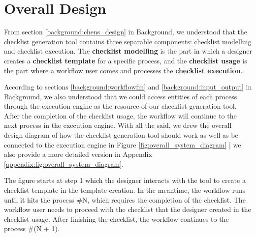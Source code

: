 


\section{Overall Design}
\label{design:overall}

From section \ref{background:chens_design} in Background, we understood that the checklist generation tool contains three separable components: checklist modelling and checklist execution. The \textbf{checklist modelling} is the part in which a designer creates a \textbf{checklist template} for a specific process, and the \textbf{checklist usage} is the part where a workflow user comes and processes the \textbf{checklist execution}.

According to sections \ref{background:workflowfm} and \ref{background:input_output} in Background, we also understood that we could access entities of each process through the execution engine as the resource of our checklist generation tool. After the completion of the checklist usage, the workflow will continue to the next process in the execution engine. With all the said, we drew the overall design diagram of how the checklist generation tool should work as well as be connected to the execution engine in Figure \ref{fig:overall_system_diagram} | we also provide a more detailed version in Appendix \ref{appendix:fig:overall_system_diagram}.

The figure starts at step 1 which the designer interacts with the tool to create a checklist template in the template creation. In the meantime, the workflow runs until it hits the process \#N, which requires the completion of the checklist. The workflow user needs to proceed with the checklist that the designer created in the checklist usage. After finishing the checklist, the workflow continues to the process \#(N + 1).


